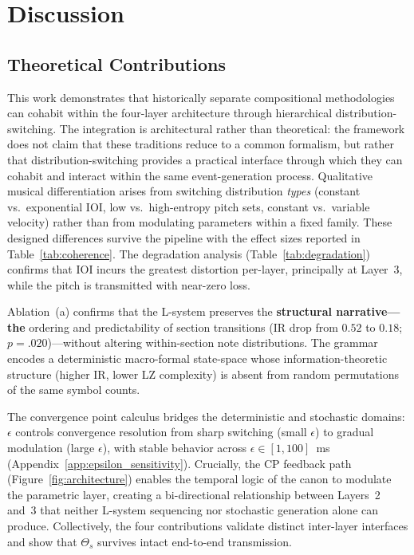 \documentclass[a4paper]{article}
\theoremstyle{definition}
\theoremstyle{remark}
\begin{document}
\section{Discussion}
\label{sec:discussion}

\subsection{Theoretical Contributions}

This work demonstrates that historically separate compositional methodologies can cohabit within the four-layer architecture through hierarchical distribution-switching. The integration is architectural rather than theoretical: the framework does not claim that these traditions reduce to a common formalism, but rather that distribution-switching provides a practical interface through which they can cohabit and interact within the same event-generation process. Qualitative musical differentiation arises from switching distribution \emph{types} (constant vs.\ exponential IOI, low vs.\ high-entropy pitch sets, constant vs.\ variable velocity) rather than from modulating parameters within a fixed family. These designed differences survive the pipeline with the effect sizes reported in Table~\ref{tab:coherence}. The degradation analysis (Table~\ref{tab:degradation}) confirms that IOI incurs the greatest distortion per-layer, principally at Layer~3, while the pitch is transmitted with near-zero loss.

Ablation~(a) confirms that the L-system preserves the \textbf{structural narrative---the} ordering and predictability of section transitions (IR drop from $0.52$ to $0.18$; $p = .020$)---without altering within-section note distributions. The grammar encodes a deterministic macro-formal state-space whose information-theoretic structure (higher IR, lower LZ complexity) is absent from random permutations of the same symbol counts.

The convergence point calculus bridges the deterministic and stochastic domains: $\epsilon$ controls convergence resolution from sharp switching (small $\epsilon$) to gradual modulation (large $\epsilon$), with stable behavior across $\epsilon \in [1, 100]$~ms (Appendix~\ref{app:epsilon_sensitivity}).
Crucially, the CP feedback path (Figure~\ref{fig:architecture}) enables the temporal logic of the canon to modulate the parametric layer, creating a bi-directional relationship between Layers~2 and~3 that neither L-system sequencing nor stochastic generation alone can produce. Collectively, the four contributions validate distinct inter-layer interfaces and show that $\Theta_s$ survives intact end-to-end transmission.
\end{document}

